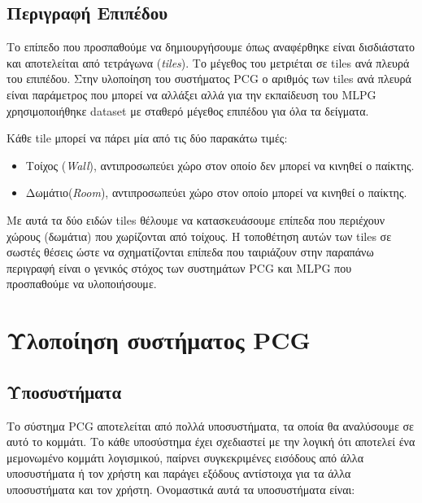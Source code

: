 \subsection{Περιγραφή Επιπέδου}
Το επίπεδο που προσπαθούμε να δημιουργήσουμε όπως αναφέρθηκε είναι δισδιάστατο και αποτελείται από τετράγωνα (\textit{tiles}). Το μέγεθος του μετριέται σε tiles ανά πλευρά του επιπέδου. Στην υλοποίηση του συστήματος PCG ο αριθμός των tiles ανά πλευρά είναι παράμετρος που μπορεί να αλλάξει αλλά για την εκπαίδευση του MLPG χρησιμοποιήθηκε dataset με σταθερό μέγεθος επιπέδου για όλα τα δείγματα.
\par
Κάθε tile μπορεί να πάρει μία από τις δύο παρακάτω τιμές:
\begin{itemize}
\item Τοίχος (\textit{Wall}), αντιπροσωπεύει χώρο στον οποίο δεν μπορεί να κινηθεί ο παίκτης.
\item Δωμάτιο(\textit{Room}), αντιπροσωπεύει χώρο στον οποίο μπορεί να κινηθεί ο παίκτης.
\end{itemize}

Με αυτά τα δύο ειδών tiles θέλουμε να κατασκευάσουμε επίπεδα που περιέχουν χώρους (δωμάτια) που χωρίζονται από τοίχους. Η τοποθέτηση αυτών των tiles σε σωστές θέσεις ώστε να σχηματίζονται επίπεδα που ταιριάζουν στην παραπάνω περιγραφή είναι ο γενικός στόχος των συστημάτων PCG και MLPG που προσπαθούμε να υλοποιήσουμε.

\section{Υλοποίηση συστήματος PCG}

\subsection{Υποσυστήματα}
Το σύστημα PCG αποτελείται από πολλά υποσυστήματα, τα οποία θα αναλύσουμε σε αυτό το κομμάτι. Το κάθε υποσύστημα έχει σχεδιαστεί με την λογική ότι αποτελεί ένα μεμονωμένο κομμάτι λογισμικού, παίρνει συγκεκριμένες εισόδους από άλλα υποσυστήματα ή τον χρήστη και παράγει εξόδους αντίστοιχα για τα άλλα υποσυστήματα και τον χρήστη. Ονομαστικά αυτά τα υποσυστήματα είναι:

